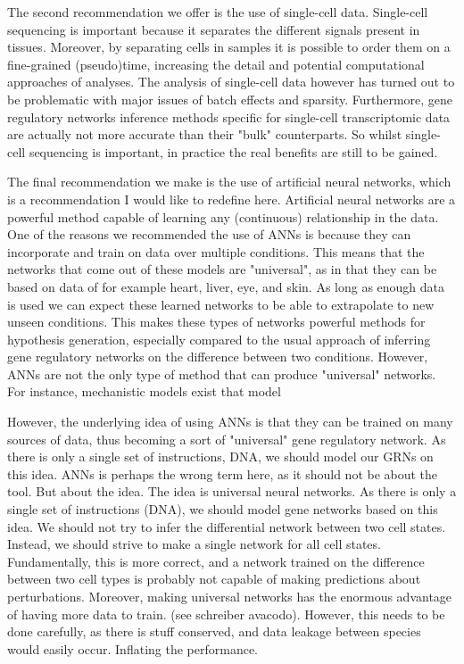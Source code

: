The second recommendation we offer is the use of single-cell data. Single-cell sequencing is important because it separates the different signals present in tissues. Moreover, by separating cells in samples it is possible to order them on a fine-grained (pseudo)time\cite{Saelens2019}, increasing the detail and potential computational approaches of analyses. The analysis of single-cell data however has turned out to be problematic with major issues of batch effects \cite{Tran2020,Haghverdi2018,Lhnemann2020} and sparsity\cite{Lhnemann2020,Bouland2023}. Furthermore, gene regulatory networks inference methods specific for single-cell transcriptomic data are actually not more accurate than their "bulk" counterparts\cite{Chen_2018}. So whilst single-cell sequencing is important, in practice the real benefits are still to be gained.

The final recommendation we make is the use of artificial neural networks, which is a recommendation I would like to redefine here. Artificial neural networks are a powerful method capable of learning any (continuous) relationship in the data\cite{Cybenko_1989,Hornik_1989}. One of the reasons we recommended the use of ANNs is because they can incorporate and train on data over multiple conditions. This means that the networks that come out of these models are "universal", as in that they can be based on data of for example heart, liver, eye, and skin. As long as enough data is used we can expect these learned networks to be able to extrapolate to new unseen conditions. This makes these types of networks powerful methods for hypothesis generation, especially compared to the usual approach of inferring gene regulatory networks on the difference between two conditions. However, ANNs are not the only type of method that can produce "universal" networks. For instance, mechanistic models exist that model 

However, the underlying idea of using ANNs is that they can be trained on many sources of data, thus becoming a sort of "universal" gene regulatory network. As there is only a single set of instructions, DNA, we should model our GRNs on this idea. 
ANNs is perhaps the wrong term here, as it should not be about the tool. But about the idea. The idea is universal neural networks. As there is only a single set of instructions (DNA), we should model gene networks based on this idea. We should not try to infer the differential network between two cell states. Instead, we should strive to make a single network for all cell states. Fundamentally, this is more correct, and a network trained on the difference between two cell types is probably not capable of making predictions about perturbations. Moreover, making universal networks has the enormous advantage of having more data to train. (see schreiber avacodo). However, this needs to be done carefully, as there is stuff conserved, and data leakage between species would easily occur. Inflating the performance.

